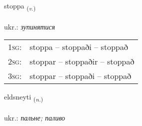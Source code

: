 \documentclass[frontgrid, backgrid]{flacards}\usepackage[]{graphicx}\usepackage[]{xcolor}
\begin{document}
\renewcommand{\flhead}{\vskip5pt \fboxsep=0pt {\small\bfseries\footnotesize Sagnorð | дієслово}}
\renewcommand{\fcfoot}{\vskip5pt \fboxsep=0pt \hspace{2pt}{\small\bfseries\footnotesize 3K}}

\renewcommand{\blhead}{\vskip5pt {\small\bfseries\footnotesize Sagnorð | дієслово }}
\renewcommand{\bcfoot}{\vskip5pt \hspace{2pt}{\small\bfseries\footnotesize 3K}}


{stoppa \small{\textsubscript{(\textit{v.})}} \\[1ex] %
\textphonetic{[stɔhpa]} \\
ukr.: \emph{зупинятися} \\  [2ex]
\renewcommand*{\arraystretch}{0.8}
\begin{tabular}{p{1cm}l}
\textsc{1sg}: & stoppa -- stoppaði -- stoppað \\ 
\textsc{2sg}: & stoppar -- stoppaðir -- stoppað \\ 
\textsc{3sg}: & stoppar -- stoppaði -- stoppað \\ 
\end{tabular}
}

\renewcommand{\flhead}{\vskip5pt \fboxsep=0pt {\small\bfseries\footnotesize Nafnorð | іменник}}
\renewcommand{\fcfoot}{\vskip5pt \fboxsep=0pt \hspace{2pt}{\small\bfseries\footnotesize 3K}}

\renewcommand{\blhead}{\vskip5pt {\small\bfseries\footnotesize Nafnorð | іменник }}
\renewcommand{\bcfoot}{\vskip5pt \hspace{2pt}{\small\bfseries\footnotesize 3K}}


{eldsneyti \small{\textsubscript{(\textit{n.})}} \\[1ex] %
\textphonetic{[ɛltstneitɪ]} \\
ukr.: \emph{пальне; паливо} \\  [2ex]
\renewcommand*{\arraystretch}{0.8}
}
\end{document}

